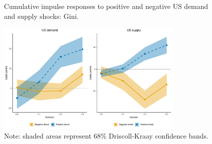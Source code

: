 \documentclass[12pt, a4paper]{article}
\begin{document}
 



\begin{figure}[H]
    \centering
    \caption{Cumulative impulse responses to positive and negative US demand and supply shocks: Gini.}
    \label{fig:demand_supply_asym}
    \includegraphics[width=0.80\textwidth]{Figures/asymmetric_IRFs.pdf}
    \centering \caption*{Note: shaded areas represent 68\% Driscoll-Kraay confidence bands.}
\end{figure}
\end{document}
